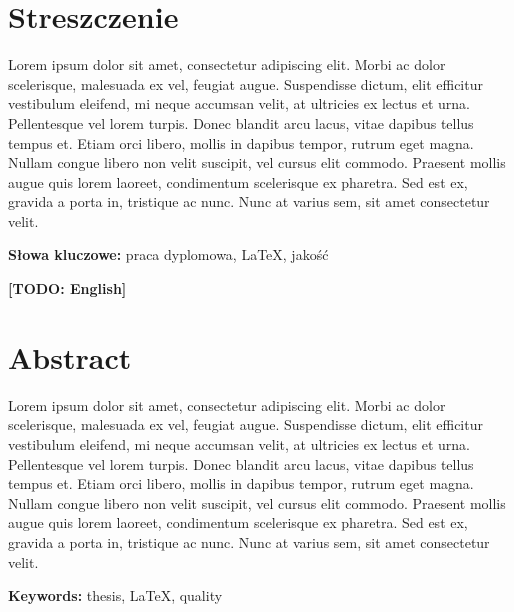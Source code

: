 \newpage
\begin{center}
  \large \bf
  \@title
\end{center}

\section*{Streszczenie}

Lorem ipsum dolor sit amet, consectetur adipiscing elit.
Morbi ac dolor scelerisque, malesuada ex vel, feugiat augue.
Suspendisse dictum, elit efficitur vestibulum eleifend, mi neque
accumsan velit, at ultricies ex lectus et urna. Pellentesque vel
lorem turpis. Donec blandit arcu lacus, vitae dapibus tellus tempus et.
Etiam orci libero, mollis in dapibus tempor, rutrum eget magna.
Nullam congue libero non velit suscipit, vel cursus elit commodo.
Praesent mollis augue quis lorem laoreet, condimentum scelerisque ex pharetra.
Sed est ex, gravida a porta in, tristique ac nunc. Nunc at varius sem, sit amet consectetur velit.

\bigskip
{\noindent\bf Słowa kluczowe:} praca dyplomowa, LaTeX, jakość

\vskip 2cm


\begin{center}
  \large \bf
  [TODO: English] \@title
\end{center}

\section*{Abstract}

Lorem ipsum dolor sit amet, consectetur adipiscing elit.
Morbi ac dolor scelerisque, malesuada ex vel, feugiat augue.
Suspendisse dictum, elit efficitur vestibulum eleifend, mi neque
accumsan velit, at ultricies ex lectus et urna. Pellentesque vel
lorem turpis. Donec blandit arcu lacus, vitae dapibus tellus tempus et.
Etiam orci libero, mollis in dapibus tempor, rutrum eget magna.
Nullam congue libero non velit suscipit, vel cursus elit commodo.
Praesent mollis augue quis lorem laoreet, condimentum scelerisque ex pharetra.
Sed est ex, gravida a porta in, tristique ac nunc. Nunc at varius sem, sit amet consectetur velit.

\bigskip
{\noindent\bf Keywords:} thesis, LaTeX, quality

\vfill